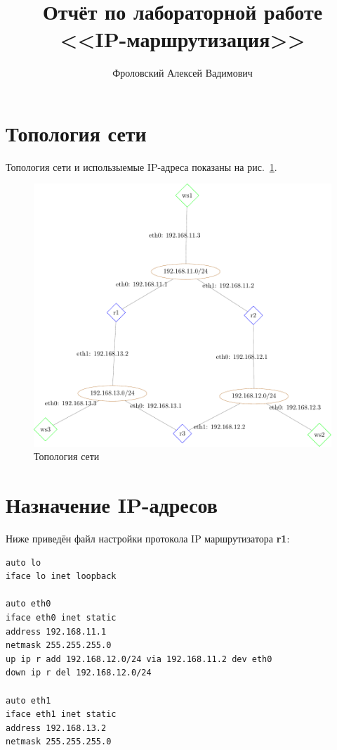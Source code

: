 \documentclass[a4paper,12pt]{article}
\title{Отчёт по лабораторной работе \\ <<IP-маршрутизация>>}
\author{Фроловский Алексей Вадимович}
\begin{document}
\maketitle

\tableofcontents

\section{Топология сети}

Топология сети и использыемые IP-адреса показаны на рис.~\ref{fig:network}.

\begin{figure}
\centering
\includegraphics[width=\textwidth]{includes/network_gv.pdf}
\caption{Топология сети}
\label{fig:network}
\end{figure}


\section{Назначение IP-адресов}

Ниже приведён файл настройки протокола IP маршрутизатора \textbf{r1}:

\begin{Verbatim}
auto lo
iface lo inet loopback

auto eth0
iface eth0 inet static
address 192.168.11.1
netmask 255.255.255.0
up ip r add 192.168.12.0/24 via 192.168.11.2 dev eth0
down ip r del 192.168.12.0/24

auto eth1
iface eth1 inet static
address 192.168.13.2
netmask 255.255.255.0
\end{Verbatim}
\end{document}

